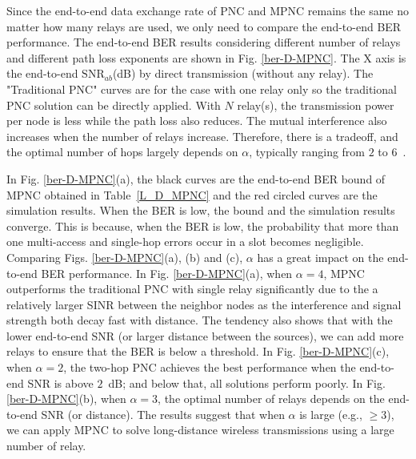 Since the end-to-end data exchange rate of PNC and MPNC remains the same no matter how many relays are used, we only need to compare the end-to-end BER performance. 
The end-to-end BER results considering different number of relays and different path loss exponents are shown in Fig. \ref{ber-D-MPNC}. The X axis is the end-to-end $\text{SNR}_{ab}$(dB) by direct transmission (without any relay). The "Traditional PNC" curves are for the case with one relay only so the traditional PNC solution can be directly applied. 
With $N$ relay(s), the transmission power per node is  less while the path loss also reduces. The mutual interference also increases when the number of relays increase. Therefore, there is a tradeoff, and the optimal number of hops largely depends on $\alpha$, typically  ranging  from $2$ to $6$~\cite{goldsmith2005wireless}. 

In Fig. \ref{ber-D-MPNC}(a), the black curves are the  end-to-end BER bound of MPNC obtained in Table~\ref{L_D_MPNC} and the red circled curves are the simulation results. When the BER is low, the bound and the simulation results converge. This is because,  when the BER is low, the probability that  more than one multi-access and single-hop errors occur in a slot becomes negligible. Comparing Figs. \ref{ber-D-MPNC}(a), (b) and (c),  $\alpha$ has a great impact on the end-to-end BER performance. In Fig. \ref{ber-D-MPNC}(a), when $\alpha=4$, MPNC outperforms the traditional PNC with single relay significantly due to the a relatively larger SINR between the neighbor nodes as the interference and signal strength both decay fast with distance. The tendency also shows that with the lower end-to-end SNR (or larger distance between the sources), we can add more relays to ensure that the BER is below a threshold.
In Fig. \ref{ber-D-MPNC}(c), when $\alpha=2$, the two-hop PNC achieves the best performance when the end-to-end SNR is above $2$~dB; and below that, all solutions perform poorly.  
In Fig. \ref{ber-D-MPNC}(b), when $\alpha=3$, the optimal number of relays depends on the end-to-end SNR (or distance). 
The results suggest that when $\alpha$ is large (e.g., $\ge3$), we can apply MPNC to solve long-distance wireless transmissions using a large number of relay. 


